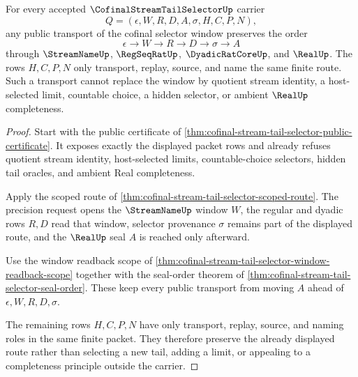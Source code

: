 \begin{theorem}
\label{thm:cofinal-stream-tail-selector-public-window-transport}
For every accepted $\CofinalStreamTailSelectorUp$ carrier
$$
Q=(\epsilon,W,R,D,A,\sigma,H,C,P,N),
$$
any public transport of the cofinal selector window preserves the order
$$
\epsilon \to W \to R \to D \to \sigma \to A
$$
through $\StreamNameUp$, $\RegSeqRatUp$, $\DyadicRatCoreUp$, and $\RealUp$. The rows $H,C,P,N$ only transport, replay, source, and name the same finite route. Such a transport cannot replace the window by quotient stream identity, a host-selected limit, countable choice, a hidden selector, or ambient $\RealUp$ completeness.
\end{theorem}
\begin{proof}
Start with the public certificate of \autoref{thm:cofinal-stream-tail-selector-public-certificate}. It exposes exactly the displayed packet rows and already refuses quotient stream identity, host-selected limits, countable-choice selectors, hidden tail oracles, and ambient Real completeness.

Apply the scoped route of \autoref{thm:cofinal-stream-tail-selector-scoped-route}. The precision request opens the $\StreamNameUp$ window $W$, the regular and dyadic rows $R,D$ read that window, selector provenance $\sigma$ remains part of the displayed route, and the $\RealUp$ seal $A$ is reached only afterward.

Use the window readback scope of \autoref{thm:cofinal-stream-tail-selector-window-readback-scope} together with the seal-order theorem of \autoref{thm:cofinal-stream-tail-selector-seal-order}. These keep every public transport from moving $A$ ahead of $\epsilon,W,R,D,\sigma$.

The remaining rows $H,C,P,N$ have only transport, replay, source, and naming roles in the same finite packet. They therefore preserve the already displayed route rather than selecting a new tail, adding a limit, or appealing to a completeness principle outside the carrier.
\end{proof}

